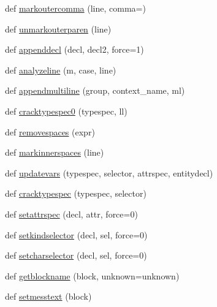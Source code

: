 \begin{DoxyCompactItemize}
\item 
def \hyperlink{namespacenumpy_1_1f2py_1_1crackfortran_a8d784dc1b55c70139e92e8c49004782f}{markoutercomma} (line, comma=\textquotesingle{})
\item 
def \hyperlink{namespacenumpy_1_1f2py_1_1crackfortran_a2d6dc55fc26f2e4a3ce9775a2c79ec8f}{unmarkouterparen} (line)
\item 
def \hyperlink{namespacenumpy_1_1f2py_1_1crackfortran_a4d7b9ddfb9f208baf0723f6525a493f1}{appenddecl} (decl, decl2, force=1)
\item 
def \hyperlink{namespacenumpy_1_1f2py_1_1crackfortran_abf9a139ecdbb51d3183071031c5a4537}{analyzeline} (m, case, line)
\item 
def \hyperlink{namespacenumpy_1_1f2py_1_1crackfortran_aa8ed44943ceb3f6614b3cedde2677acb}{appendmultiline} (group, context\+\_\+name, ml)
\item 
def \hyperlink{namespacenumpy_1_1f2py_1_1crackfortran_a97466a34f07a6c14e6f1b431492f4b10}{cracktypespec0} (typespec, ll)
\item 
def \hyperlink{namespacenumpy_1_1f2py_1_1crackfortran_a2e8aeb0ccd9778569ea551554825c0be}{removespaces} (expr)
\item 
def \hyperlink{namespacenumpy_1_1f2py_1_1crackfortran_ab68799ac44d9ae463bfa70de63bd6ce7}{markinnerspaces} (line)
\item 
def \hyperlink{namespacenumpy_1_1f2py_1_1crackfortran_ab4865d85b5e272444fad6ce23ce57103}{updatevars} (typespec, selector, attrspec, entitydecl)
\item 
def \hyperlink{namespacenumpy_1_1f2py_1_1crackfortran_a9ad33be9024971ccb79915990632432d}{cracktypespec} (typespec, selector)
\item 
def \hyperlink{namespacenumpy_1_1f2py_1_1crackfortran_a7e2dc2d70d331dbc26953217788726ea}{setattrspec} (decl, attr, force=0)
\item 
def \hyperlink{namespacenumpy_1_1f2py_1_1crackfortran_adf195e0b13b3bac9e2c4a54c81f33fde}{setkindselector} (decl, sel, force=0)
\item 
def \hyperlink{namespacenumpy_1_1f2py_1_1crackfortran_ac4fb4a7b1d16f829715aa584607f39c1}{setcharselector} (decl, sel, force=0)
\item 
def \hyperlink{namespacenumpy_1_1f2py_1_1crackfortran_a82040997fd5fcab1991ccc0e70663cfe}{getblockname} (block, unknown=\textquotesingle{}unknown\textquotesingle{})
\item 
def \hyperlink{namespacenumpy_1_1f2py_1_1crackfortran_a0c27fc32258cfb8396e1bd0c6f038711}{setmesstext} (block)

\end{DoxyCompactItemize}
